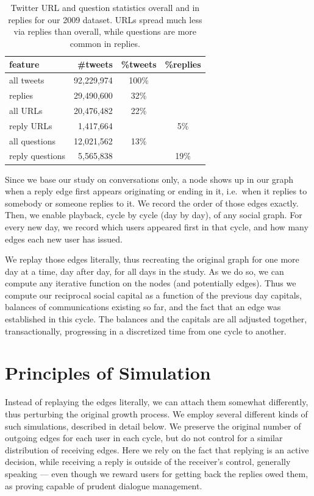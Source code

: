 \documentclass[10pt,oneside]{memoir}
\begin{document}
\begin{table}
\begin{tabular}{|lrcc|}
\toprule
feature & \#tweets & \%tweets & \%replies \\
\midrule
all tweets & 92,229,974 & 100\% & \space\\
replies & 29,490,600 & 32\% & \space \\
all URLs & 20,476,482 &  22\% & \space \\
reply URLs & 1,417,664 & \space & 5\% \\
all questions & 12,021,562 & 13\% & \space \\
reply questions & 5,565,838 & \space & 19\% \\
\bottomrule
\end{tabular}
\label{table:reply-stats}
\caption{Twitter URL and question statistics overall and in replies for our 2009 dataset.  URLs spread much less via replies than overall, while questions are more common in replies.}
\end{table}
Since we base our study on conversations only, a node shows up in our graph when a reply edge first appears originating or ending in it, i.e.\ when it replies to somebody or someone replies to it.  We record the order of those edges exactly.
Then, we enable playback, cycle by cycle (day by day), of any social graph.  For every new day, we record which users appeared first in that cycle, and how many edges each new user has issued.


We replay those edges literally, thus recreating the original graph for one more day at a time, day after day, for all days in the study.  As we do so, we can compute any iterative function on the nodes (and potentially edges).  Thus we compute our reciprocal social capital as a function of the previous day capitals, balances of communications existing so far, and the fact that an edge was established in this cycle.  The balances and the capitals are all adjusted together, transactionally, progressing in a discretized time from one cycle to another.


\pagebreak \section{Principles of Simulation}
\label{principlesofsimulation}

Instead of replaying the edges literally, we can attach them somewhat differently, thus perturbing the original growth process.  We employ several different kinds of such simulations, described in detail below.  We preserve the original number of outgoing edges for each user in each cycle, but do not control for a similar distribution of receiving edges.  Here we rely on the fact that replying is an active decision, while receiving a reply is outside of the receiver's control, generally speaking --- even though we reward users for getting back the replies owed them, as proving capable of prudent dialogue management.
\end{document}
